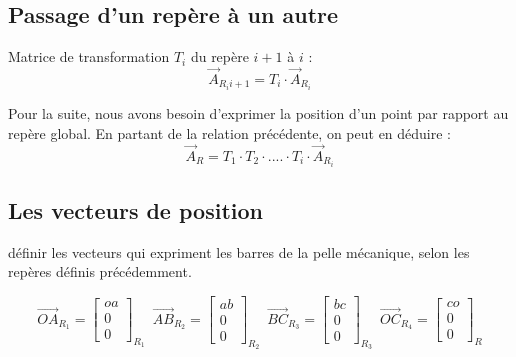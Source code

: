 \documentclass[12pt,a4paper]{article}
\begin{document}
\medbreak



\medbreak


\subsection{Passage d'un repère à un autre}
Matrice de transformation $T_i$ du repère $i+1$ à $i$ : 
\begin{equation}
\vec{A}_{R_i{i+1}}=T_i \cdot \vec{A}_{R_i}
\end{equation}

Pour la suite, nous avons besoin d'exprimer la position d'un point par rapport au repère global. En partant de la relation précédente, on peut en déduire : 
\begin{equation}
\vec{A}_R=T_1 \cdot T_2 \cdot .... \cdot T_i \cdot \vec{A}_{R_i}
\end{equation}


\subsection{Les vecteurs de position}

définir les vecteurs qui expriment les barres de la pelle mécanique, selon les repères définis précédemment. 

\begin{equation}
\vec{OA}_{R_1}=
\begin{bmatrix}
oa \\
0\\
0
\end{bmatrix}_{R_1} \enspace
\vec{AB}_{R_{2}}=
\begin{bmatrix}
ab \\
0\\
0
\end{bmatrix}_{R_2} \enspace
\vec{BC}_{R_{3}}=
\begin{bmatrix}
bc \\
0\\
0
\end{bmatrix}_{R_3} \enspace
\vec{OC}_{R_4}=
\begin{bmatrix}
co \\
0\\
0
\end{bmatrix}_{R}
\end{equation}

\medbreak
\end{document}
